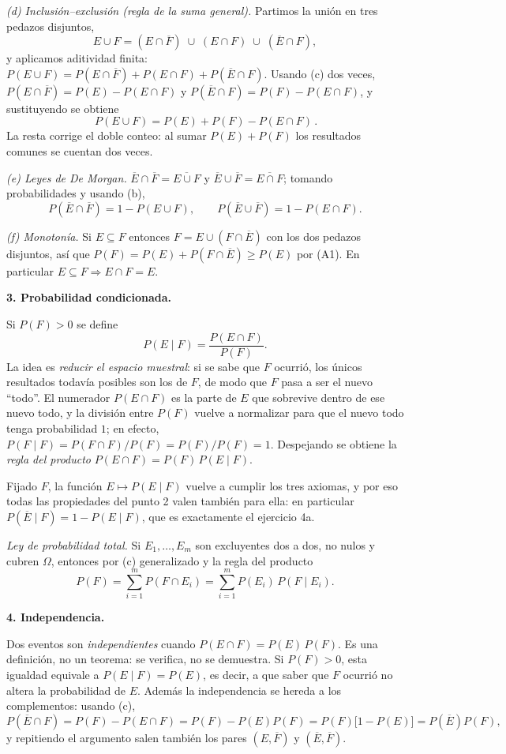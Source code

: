 \documentclass[11pt]{article}
\begin{document}
\begin{teo}
\emph{(d) Inclusión--exclusión (regla de la suma general).} Partimos la unión en tres pedazos
disjuntos,
\[
E\cup F=(E\cap\overline{F})\;\cup\;(E\cap F)\;\cup\;(\overline{E}\cap F),
\]
y aplicamos aditividad finita:
$P(E\cup F)=P(E\cap\overline{F})+P(E\cap F)+P(\overline{E}\cap F)$. Usando (c) dos veces,
$P(E\cap\overline{F})=P(E)-P(E\cap F)$ y $P(\overline{E}\cap F)=P(F)-P(E\cap F)$, y
sustituyendo se obtiene
\[
\boxed{\,P(E\cup F)=P(E)+P(F)-P(E\cap F)\,}.
\]
La resta corrige el doble conteo: al sumar $P(E)+P(F)$ los resultados comunes se cuentan dos
veces.

\emph{(e) Leyes de De Morgan.} $\overline{E}\cap\overline{F}=\overline{E\cup F}$ y
$\overline{E}\cup\overline{F}=\overline{E\cap F}$; tomando probabilidades y usando (b),
\[
P(\overline{E}\cap\overline{F})=1-P(E\cup F),\qquad
P(\overline{E}\cup\overline{F})=1-P(E\cap F).
\]

\emph{(f) Monotonía.} Si $E\subseteq F$ entonces $F=E\cup(F\cap\overline{E})$ con los dos
pedazos disjuntos, así que $P(F)=P(E)+P(F\cap\overline{E})\ge P(E)$ por (A1). En particular
$E\subseteq F\Rightarrow E\cap F=E$.

\medskip
\textbf{3. Probabilidad condicionada.}

Si $P(F)>0$ se define
\[
P(E\mid F)=\frac{P(E\cap F)}{P(F)} .
\]
La idea es \emph{reducir el espacio muestral}: si se sabe que $F$ ocurrió, los únicos
resultados todavía posibles son los de $F$, de modo que $F$ pasa a ser el nuevo ``todo''. El
numerador $P(E\cap F)$ es la parte de $E$ que sobrevive dentro de ese nuevo todo, y la
división entre $P(F)$ vuelve a normalizar para que el nuevo todo tenga probabilidad $1$; en
efecto, $P(F\mid F)=P(F\cap F)/P(F)=P(F)/P(F)=1$. Despejando se obtiene la \emph{regla del
producto} $P(E\cap F)=P(F)\,P(E\mid F)$.

Fijado $F$, la función $E\mapsto P(E\mid F)$ vuelve a cumplir los tres axiomas, y por eso
todas las propiedades del punto 2 valen también para ella: en particular
$P(\overline{E}\mid F)=1-P(E\mid F)$, que es exactamente el ejercicio 4a.

\emph{Ley de probabilidad total.} Si $E_1,\dots,E_m$ son excluyentes dos a dos, no nulos y
cubren $\Omega$, entonces por (c) generalizado y la regla del producto
\[
P(F)=\sum_{i=1}^{m}P(F\cap E_i)=\sum_{i=1}^{m}P(E_i)\,P(F\mid E_i).
\]

\medskip
\textbf{4. Independencia.}

Dos eventos son \emph{independientes} cuando $P(E\cap F)=P(E)\,P(F)$. Es una definición, no un
teorema: se verifica, no se demuestra. Si $P(F)>0$, esta igualdad equivale a
$P(E\mid F)=P(E)$, es decir, a que saber que $F$ ocurrió no altera la probabilidad de $E$.
Además la independencia se hereda a los complementos: usando (c),
\[
P(\overline{E}\cap F)=P(F)-P(E\cap F)=P(F)-P(E)P(F)=P(F)\bigl[1-P(E)\bigr]=P(\overline{E})P(F),
\]
y repitiendo el argumento salen también los pares $(E,\overline{F})$ y
$(\overline{E},\overline{F})$.


\end{teo}
\end{document}

